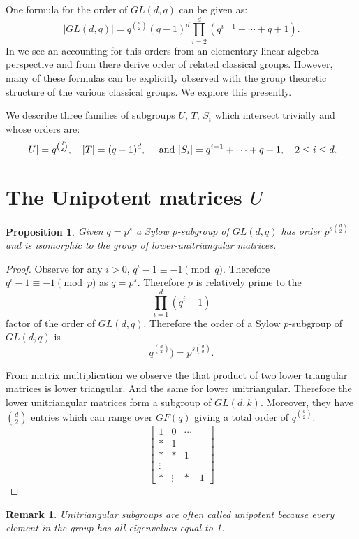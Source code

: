 \documentclass[12pt]{article}
\newtheorem{prop}[thm]{Proposition}
\newtheorem{remark}[thm]{Remark}
\begin{document}
One formula for the order of $GL(d,q)$ can be given as:
\[|GL(d,q)|=q^{\binom{d}{2}}(q-1)^d\prod_{i=2}^d (q^{i-1}+\cdots + q + 1).\]
In  we see an accounting for this orders from an elementary linear algebra perspective and from there derive order of related classical groups.   However, many of these formulas can be explicitly observed with the group theoretic structure of the various classical groups.  We explore this presently.

We describe three families of subgroups $U$, $T$, $S_i$ which intersect trivially and whose orders are:
\[
|U|=q^{\binom{d}{2}}, \quad |T|=(q-1)^d, \quad\textnormal{ and }
|S_i|=q^{i-1}+\cdots + q + 1,\quad 2\leq i\leq d.
\]

\section{The Unipotent matrices $U$}

\begin{prop}
Given $q=p^s$ a Sylow $p$-subgroup of $GL(d,q)$ has order $p^{s\binom{d}{2}}$ 
and is isomorphic to the group of lower-unitriangular matrices.  
\end{prop}
\begin{proof}
Observe for any $i>0$, $q^i-1\equiv -1\pmod{q}$.  Therefore
$q^i-1\equiv -1\pmod{p}$ as $q=p^s$.  Therefore $p$ is relatively prime to the
\[\prod_{i=1}^d (q^i-1)\]
factor of the order of $GL(d,q)$.  Therefore the order of a Sylow $p$-subgroup
of $GL(d,q)$ is 
\[q^{\binom{d}{2}})=p^{s\binom{d}{d}}.\]

From matrix multiplication we observe the that product of two lower triangular 
matrices is lower triangular.  And the same for lower unitriangular.  Therefore
the lower unitriangular matrices form a subgroup of $GL(d,k)$.  Moreover, they 
have $\binom{d}{2}$ entries which can range over $GF(q)$ giving a total order of
$q^{\binom{d}{2}}$.
\[
\begin{bmatrix}
1 & 0 & \cdots \\
* & 1 & \\
* & * & 1 \\
\vdots & \\
* & \vdots & * & 1
\end{bmatrix}
\]
\end{proof}
\begin{remark}
Unitriangular subgroups are often called \emph{unipotent} because every element in the group has all eigenvalues equal to 1.  
\end{remark}
\end{document}
